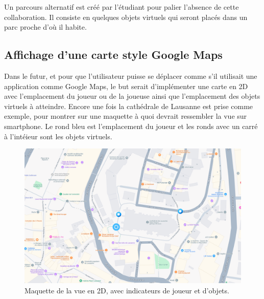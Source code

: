 Un parcours alternatif est créé par l'étudiant pour palier l'absence de
cette collaboration. Il consiste en quelques objets virtuels qui seront placés dans un parc proche d'où il habite.

\subsection{Affichage d'une carte style Google Maps}
Dans le futur, et pour que l'utilisateur puisse se déplacer comme s'il utilisait une application comme
Google Maps, le but serait d'implémenter une carte en 2D avec l'emplacement du joueur ou de la joueuse ainsi que l'emplacement
des objets virtuels à atteindre. Encore une fois la cathédrale de Lausanne est prise comme exemple, pour montrer sur une maquette à quoi
devrait ressembler la vue sur smartphone. Le rond bleu est l'emplacement du joueur et les ronds avec un carré à l'intéieur sont les objets
virtuels.

\begin{figure}[H]
    \centering
    \includegraphics[width=1\linewidth]{assets/figures/Screenshots/Maps.png}
    \caption{Maquette de la vue en 2D, avec indicateurs de joueur et d'objets.}
    \label{fig:Maps}
\end{figure}


